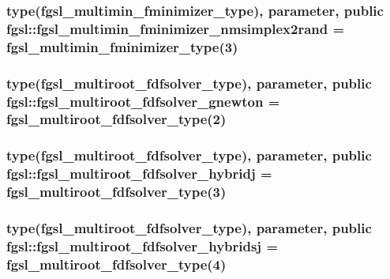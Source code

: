 \subsubsection[{fgsl\+\_\+multimin\+\_\+fminimizer\+\_\+nmsimplex2rand}]{\setlength{\rightskip}{0pt plus 5cm}type({\bf fgsl\+\_\+multimin\+\_\+fminimizer\+\_\+type}), parameter, public fgsl\+::fgsl\+\_\+multimin\+\_\+fminimizer\+\_\+nmsimplex2rand = {\bf fgsl\+\_\+multimin\+\_\+fminimizer\+\_\+type}(3)}\label{namespacefgsl_a1d64d873582c83a3e43c44d10ada296e}
\hypertarget{namespacefgsl_a4ecb43f393dacc9cefa731f8aec97f40}{}
\subsubsection[{fgsl\+\_\+multiroot\+\_\+fdfsolver\+\_\+gnewton}]{\setlength{\rightskip}{0pt plus 5cm}type({\bf fgsl\+\_\+multiroot\+\_\+fdfsolver\+\_\+type}), parameter, public fgsl\+::fgsl\+\_\+multiroot\+\_\+fdfsolver\+\_\+gnewton = {\bf fgsl\+\_\+multiroot\+\_\+fdfsolver\+\_\+type}(2)}\label{namespacefgsl_a4ecb43f393dacc9cefa731f8aec97f40}
\hypertarget{namespacefgsl_a3a3728bb3d1d1a699c08a4a02af2eac1}{}
\subsubsection[{fgsl\+\_\+multiroot\+\_\+fdfsolver\+\_\+hybridj}]{\setlength{\rightskip}{0pt plus 5cm}type({\bf fgsl\+\_\+multiroot\+\_\+fdfsolver\+\_\+type}), parameter, public fgsl\+::fgsl\+\_\+multiroot\+\_\+fdfsolver\+\_\+hybridj = {\bf fgsl\+\_\+multiroot\+\_\+fdfsolver\+\_\+type}(3)}\label{namespacefgsl_a3a3728bb3d1d1a699c08a4a02af2eac1}
\hypertarget{namespacefgsl_a4d6c0533915b025bbb86fb16727964ca}{}
\subsubsection[{fgsl\+\_\+multiroot\+\_\+fdfsolver\+\_\+hybridsj}]{\setlength{\rightskip}{0pt plus 5cm}type({\bf fgsl\+\_\+multiroot\+\_\+fdfsolver\+\_\+type}), parameter, public fgsl\+::fgsl\+\_\+multiroot\+\_\+fdfsolver\+\_\+hybridsj = {\bf fgsl\+\_\+multiroot\+\_\+fdfsolver\+\_\+type}(4)}\label{namespacefgsl_a4d6c0533915b025bbb86fb16727964ca}
\hypertarget{namespacefgsl_ae80cc34511a1cc786b0fb5617e3929ed}{}
